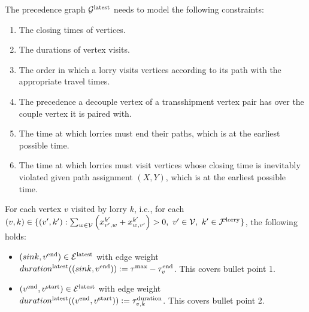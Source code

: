 





The precedence graph
$\mathcal G^{\rm latest} $
needs to model the following constraints:
\begin{enumerate}
  \item \label{latest:closing} The closing times of vertices.
  \item The durations of vertex visits.
  \item The order in which a lorry visits vertices according to its path with the appropriate travel times.
  \item The precedence a decouple vertex of a transshipment vertex pair has over the couple vertex it is paired with.
  \item The time at which lorries must end their paths, which is at the earliest possible time.
  \item The time at which lorries must visit vertices whose closing time is inevitably violated given path assignment $(X,Y) $, which is at the earliest possible time.
\end{enumerate}

%


For each vertex $v$ visited by lorry $k$, i.e., for each
 $(v,k) \in  \{ (v',k') :
\sum_{w \in \mathcal V} 
\left( 
x^{k'}_{v',w} + x^{k'}_{w,v'}
\right) 
> 0,
\ v' \in \mathcal V,
\ k' \in \mathcal F^{\rm lorry} \}$,
the following holds:
\begin{itemize}
  \item
  $( sink,v^{\rm end})  \in \mathcal E^{\rm latest} $
  with edge weight
    $duration^{\rm latest}((sink,v^{\rm end})) := \tau^{\rm max} - \tau^{\rm end}_v $.
    This covers bullet point 1.
  \item
  $(v^{\rm end},v^{\rm start}) \in \mathcal E^{\rm latest}$
  with edge weight
  $duration^{\rm latest}((v^{\rm end},v^{\rm start})) := \tau^{\rm duration}_{v,k}$.
  This covers bullet point 2.
\end{itemize}



